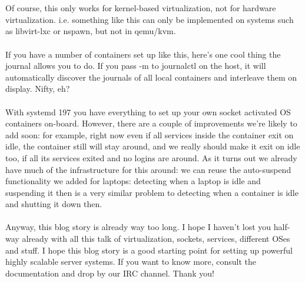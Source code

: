 \documentclass[titlepage]{article}
\begin{document}
\\
\\
Of course, this only works for kernel-based virtualization, not for hardware virtualization. i.e. something like this can only be implemented on systems such as libvirt-lxc or nspawn, but not in qemu/kvm.
\\
\\
If you have a number of containers set up like this, here's one cool thing the journal allows you to do. If you pass -m to journalctl on the host, it will automatically discover the journals of all local containers and interleave them on display. Nifty, eh?
\\
\\
With systemd 197 you have everything to set up your own socket activated OS containers on-board. However, there are a couple of improvements we're likely to add soon: for example, right now even if all services inside the container exit on idle, the container still will stay around, and we really should make it exit on idle too, if all its services exited and no logins are around. As it turns out we already have much of the infrastructure for this around: we can reuse the auto-suspend functionality we added for laptops: detecting when a laptop is idle and suspending it then is a very similar problem to detecting when a container is idle and shutting it down then.
\\
\\
Anyway, this blog story is already way too long. I hope I haven't lost you half-way already with all this talk of virtualization, sockets, services, different OSes and stuff. I hope this blog story is a good starting point for setting up powerful highly scalable server systems. If you want to know more, consult the documentation and drop by our IRC channel. Thank you!
\end{document}
